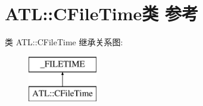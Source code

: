 \hypertarget{class_a_t_l_1_1_c_file_time}{}\section{A\+TL\+:\+:C\+File\+Time类 参考}
\label{class_a_t_l_1_1_c_file_time}
类 A\+TL\+:\+:C\+File\+Time 继承关系图\+:\begin{figure}[H]
\begin{center}
\leavevmode
\includegraphics[height=2.000000cm]{class_a_t_l_1_1_c_file_time}
\end{center}
\end{figure}
